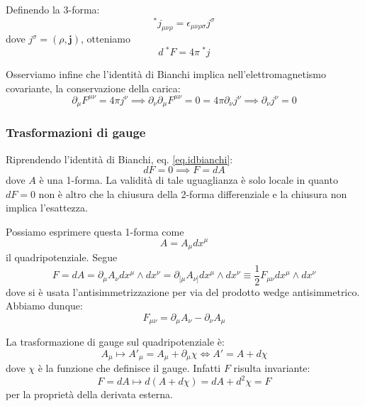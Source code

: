 Definendo la 3-forma:
\begin{equation*}
    ^*j_{\mu\nu\rho} = \epsilon_{\mu\nu\rho\sigma}j^{\sigma}
\end{equation*}
dove $j^\sigma= (\rho,\bm{j}) $, otteniamo
\begin{equation*}
    d \ ^*F = 4\pi \ ^*j
\end{equation*}

Osserviamo infine che l'identità di Bianchi implica nell'elettromagnetismo covariante, la conservazione della carica:
\begin{equation*}
    \partial_\mu F^{\mu\nu} = 4 \pi j^\nu \implies \partial_\nu\partial_\mu F^{\mu\nu} = 0 = 4 \pi \partial_\nu j^\nu \implies \partial_\nu j^\nu = 0 
\end{equation*}
\subsubsection{Trasformazioni di gauge}
Riprendendo l'identità di Bianchi, eq. \ref{eq.idbianchi}:
\begin{equation}
dF=0 \implies F = dA
\end{equation}
dove $A$ è una 1-forma. La validità di tale uguaglianza è solo locale in quanto $dF=0$ non è altro che la chiusura della 2-forma differenziale e la chiusura non implica l'esattezza.

Possiamo esprimere questa 1-forma come
\begin{equation*}
    A = A_\mu dx^\mu
\end{equation*}
il quadripotenziale. Segue
\begin{equation*}
    F = dA = \partial_\mu A_\nu dx^\mu \wedge dx^\nu = \partial_{[\mu} A_{\nu]} dx^\mu \wedge dx^\nu \equiv \frac{1}{2}F_{\mu\nu} dx^\mu \wedge dx^\nu
\end{equation*}
dove si è usata l'antisimmetrizzazione per via del prodotto wedge antisimmetrico. Abbiamo dunque:
\begin{equation}
    F_{\mu\nu} = \partial_{\mu} A_\nu - \partial_\nu A_\mu
\end{equation}

La trasformazione di gauge sul quadripotenziale è:
\begin{equation*}
    A_\mu \mapsto A'_\mu = A_\mu+ \partial_\mu \chi \iff A' = A + d\chi
\end{equation*}
dove $\chi$ è la funzione che definisce il gauge. Infatti $F$ risulta invariante:
\begin{equation*}
    F = dA \mapsto d(A+d\chi) = dA + d^2\chi = F
\end{equation*}
per la proprietà della derivata esterna.

